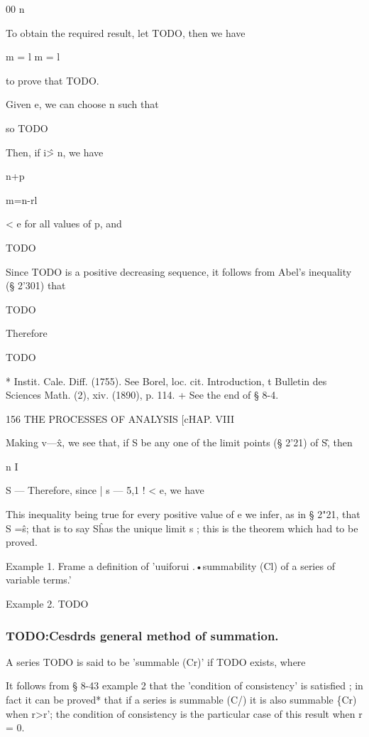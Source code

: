 00 n

To obtain the required result, let TODO, then we have

m = l m = l

to prove that TODO.



Given e, we can choose n such that

so TODO

Then, if i\^ > n, we have



n+p


m=n-rl



< e for all values of p, and



TODO

Since TODO is a positive decreasing sequence, it follows
from Abel's inequality (§ 2'301) that

TODO

Therefore

TODO

* Instit. Cale. Diff. (1755). See Borel, loc. cit. Introduction,
t Bulletin des Sciences Math. (2), xiv. (1890), p. 114.
+ See the end of § 8-4.



156 THE PROCESSES OF ANALYSIS [cHAP. VIII

Making v—\^x, we see that, if S be any one of the limit points (§ 2'21)
of S\^ , then

n I

S — %
Therefore, since | s — 5,1 ! < e, we have

This inequality being true for every positive value of e we infer, as in § 2"21,
that S =\^s; that is to say S\^ has the unique limit s ; this is the theorem which
had to be proved.

Example 1. Frame a definition of 'uuiforui .•summability (Cl) of a series of variable
terms.'

Example 2. TODO

\subsubsection{TODO:Cesdrds general method of summation.}

A series TODO is said to be 'summable (Cr)' if TODO exists, where

It follows from § 8-43 example 2 that the 'condition of consistency' is satisfied ; in
fact it can be proved* that if a series is summable (C/) it is also summable \{Cr) when
r>r'; the condition of consistency is the particular case of this result when r = 0.

